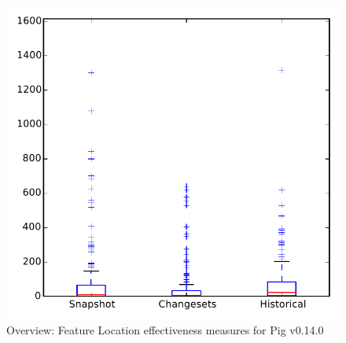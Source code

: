 
\begin{figure}
\centering
\includegraphics[height=0.4\textheight]{figures/flt/all_pig}
\caption{Overview: Feature Location effectiveness measures for Pig v0.14.0}
\label{fig:flt:all:pig}
\end{figure}
